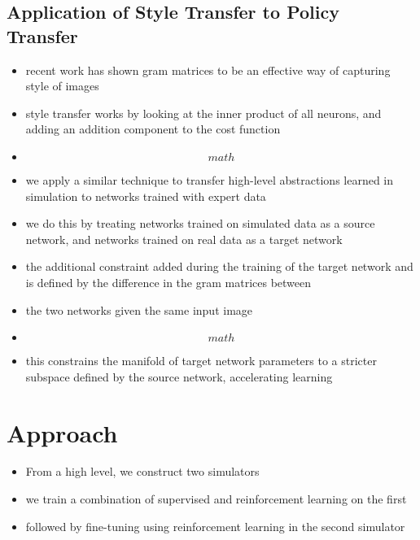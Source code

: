 \documentclass[paper=a4, fontsize=11pt]{scrartcl} %
\begin{document}
	\subsection{Application of Style Transfer to Policy Transfer}
	\begin{itemize}
		\item recent work has shown gram matrices to be an effective way of capturing style of images \cite{Gatys2015}
		\item style transfer works by looking at the inner product of all neurons, and adding an addition component to the cost function
		\item \[math\]
		\item we apply a similar technique to transfer high-level abstractions learned in simulation to networks trained with expert data
		\item we do this by treating networks trained on simulated data as a source network, and networks trained on real data as a target network
		\item the additional constraint added during the training of the target network and is defined by the difference in the gram matrices between
		\item the two networks given the same input image
		\item \[math\]
		\item this constrains the manifold of target network parameters to a stricter subspace defined by the source network, accelerating learning
	\end{itemize}


\section{Approach} 
\begin{itemize}
	\item From a high level, we construct two simulators
	\item we train a combination of supervised and reinforcement learning on the first
	\item followed by fine-tuning using reinforcement learning in the second simulator
\end{itemize}
\end{document}
